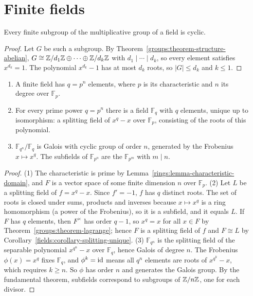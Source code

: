 \section{Finite fields}\label{fields:section-finite-fields}

\begin{lemma}\label{fields:lemma-cyclic}
Every finite subgroup of the multiplicative group of a field is cyclic.
\end{lemma}

\begin{proof}
Let $G$ be such a subgroup. By Theorem~\ref{groups:theorem-structure-abelian},
$G \cong \mathbb{Z}/d_1\mathbb{Z} \oplus \cdots \oplus \mathbb{Z}/d_k\mathbb{Z}$ with $d_1 \mid \cdots \mid d_k$, so every element satisfies
$x^{d_k} = 1$. The polynomial $x^{d_k} - 1$ has at most $d_k$ roots, so $|G| \leq d_k$ and
$k \leq 1$.
\end{proof}

\begin{theorem}\label{fields:theorem-finite-fields}
\begin{enumerate}
\item A finite field has $q = p^n$ elements, where $p$ is its characteristic and $n$ its
degree over $\mathbb{F}_p$.
\item For every prime power $q = p^n$ there is a field $\mathbb{F}_q$ with $q$ elements, unique up to
isomorphism: a splitting field of $x^q - x$ over $\mathbb{F}_p$, consisting of the roots of this
polynomial.
\item $\mathbb{F}_{q^n}/\mathbb{F}_q$ is Galois with cyclic group of order $n$, generated by the
Frobenius $x \mapsto x^q$. The subfields of $\mathbb{F}_{p^n}$ are the $\mathbb{F}_{p^m}$ with $m \mid n$.
\end{enumerate}
\end{theorem}

\begin{proof}
(1) The characteristic is prime by Lemma~\ref{rings:lemma-characteristic-domain}, and $F$ is
a vector space of some finite dimension $n$ over $\mathbb{F}_p$.
(2) Let $L$ be a splitting field of $f = x^q - x$. Since $f' = -1$, $f$ has $q$ distinct roots. The
set of roots is closed under sums, products and inverses because $x \mapsto x^q$ is a ring
homomorphism (a power of the Frobenius), so it is a subfield, and it equals $L$. If $F$ has $q$
elements, then $F^\times$ has order $q - 1$, so $x^q = x$ for all $x \in F$ by
Theorem~\ref{groups:theorem-lagrange}; hence $F$ is a splitting field of $f$ and $F \cong L$ by
Corollary~\ref{fields:corollary-splitting-unique}.
(3) $\mathbb{F}_{q^n}$ is the splitting field of the separable polynomial $x^{q^n} - x$ over
$\mathbb{F}_q$, hence Galois of degree $n$. The Frobenius $\phi(x) = x^q$ fixes $\mathbb{F}_q$, and
$\phi^k = \mathrm{id}$ means all $q^n$ elements are roots of $x^{q^k} - x$, which requires $k \geq n$. So $\phi$
has order $n$ and generates the Galois group. By the fundamental theorem, subfields
correspond to subgroups of $\mathbb{Z}/n\mathbb{Z}$, one for each divisor.
\end{proof}


